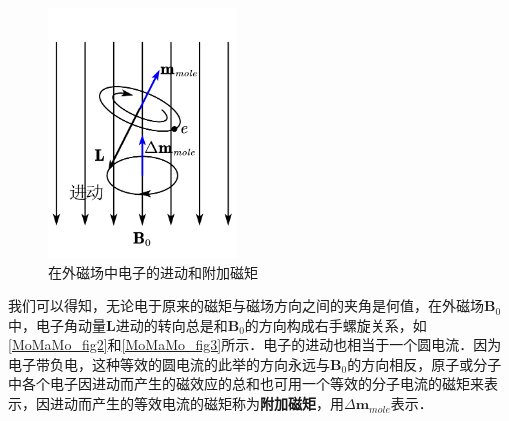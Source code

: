 \begin{figure}[ht]
\centering
\includegraphics[width=5cm]{./figures/MoMaMo_3.pdf}
\caption{在外磁场中电子的进动和附加磁矩} \label{MoMaMo_fig3}
\end{figure}

我们可以得知，无论电于原来的磁矩与磁场方向之间的夹角是何值，在外磁场$\mathbf B_0$中，电子角动量$\mathbf L$进动的转向总是和$\mathbf B_0$的方向构成右手螺旋关系，如\autoref{MoMaMo_fig2}和\autoref{MoMaMo_fig3}所示．电子的进动也相当于一个圆电流．因为电子带负电，这种等效的圆电流的此举的方向永远与$\mathbf B_0$的方向相反，原子或分子中各个电子因进动而产生的磁效应的总和也可用一个等效的分子电流的磁矩来表示，因进动而产生的等效电流的磁矩称为\textbf{附加磁矩}，用$\Delta\mathbf m_{mole}$表示．
